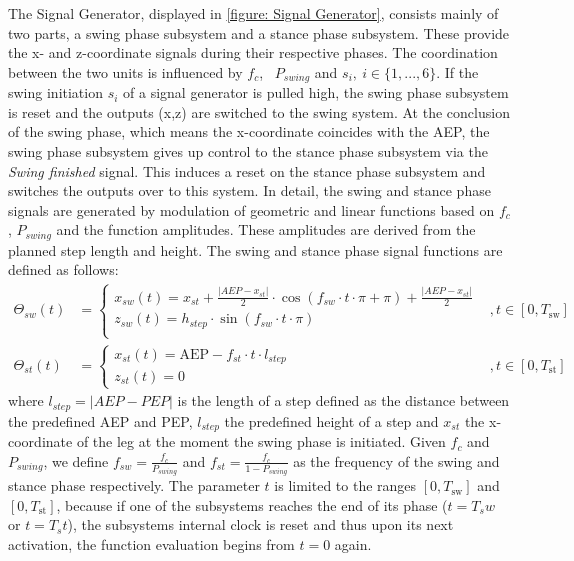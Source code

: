 The Signal Generator, displayed in \ref{figure: Signal Generator}, consists mainly of two parts, a swing phase subsystem and a stance phase subsystem.
These provide the x- and z-coordinate signals during their respective phases.
The coordination between the two units is influenced by $f_c$, \ $P_{swing}$ and $s_i,\ i \in \{1,...,6\}$.
If the swing initiation $s_i$ of a signal generator is pulled high, the swing phase subsystem is reset and the outputs (x,z) are switched to the swing system.
At the conclusion of the swing phase, which means the x-coordinate coincides with the AEP, the swing phase subsystem gives up control to the stance phase subsystem via the \textit{Swing finished} signal.
This induces a reset on the stance phase subsystem and switches the outputs over to this system.
In detail, the swing and stance phase signals are generated by modulation of geometric and linear functions based on $f_c$, $P_{swing}$ and the function amplitudes.
These amplitudes are derived from the planned step length and height.
The swing and stance phase signal functions are defined as follows:
\begin{align}
	\Theta_{sw}(t) & = 
	\begin{cases}
		x_{sw}(t) = x_{st} + \frac{|AEP - x_{st}|}{2} \cdot \cos(f_{sw} \cdot t \cdot \pi + \pi) + \frac{|AEP - x_{st}|}{2} \\
		z_{sw}(t) = h_{step} \cdot \sin(f_{sw} \cdot t \cdot \pi) \\
	\end{cases} & , t \in [0,T_\text{sw}] 
	\\
	\Theta_{st}(t) & =
	\begin{cases}
		x_{st}(t) = \text{AEP} - f_{st} \cdot t \cdot l_{step}\\
		z_{st}(t) = 0
	\end{cases} & , t \in [0, T_\text{st}]    
\end{align}
where $l_{step} = |AEP - PEP|$ is the length of a step defined as the distance between the predefined AEP and PEP, $l_{step}$ the predefined height of a step and $x_{st}$ the x-coordinate of the leg at the moment the swing phase is initiated.
Given $f_c$ and $P_{swing}$, we define $f_{sw} = \frac{f_c}{P_{swing}}$ and $f_{st} = \frac{f_c}{1-P_{swing}}$ as the frequency of the swing and stance phase respectively.
The parameter $t$ is limited to the ranges $[0,T_\text{sw}]$ and $[0, T_\text{st}]$, because if one of the subsystems reaches the end of its phase ($t=T_sw$ or $t=T_st$), the subsystems internal clock is reset and thus upon its next activation, the function evaluation begins from $t=0$ again.

